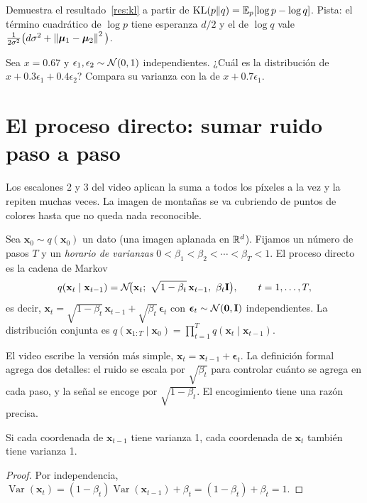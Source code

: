 \documentclass[11pt,letterpaper,oneside]{report}
\newcommand{\xb}{\mathbf{x}}
\newcommand{\eb}{\boldsymbol{\epsilon}}
\newcommand{\Ib}{\mathbf{I}}
\begin{document}
\begin{ejercicio}
Demuestra el resultado~\ref{res:kl} a partir de $\operatorname{KL}(p\Vert q)=\mathbb{E}_p[\log p-\log q]$. Pista: el término cuadrático de $\log p$ tiene esperanza $d/2$ y el de $\log q$ vale $\tfrac{1}{2\sigma^2}\big(d\sigma^2+\left\lVert \boldsymbol\mu_1-\boldsymbol\mu_2 \right\rVert^2\big)$.
\end{ejercicio}

\begin{ejercicio}
Sea $x=0.67$ y $\epsilon_1,\epsilon_2\sim\mathcal{N}(0,1)$ independientes. ¿Cuál es la distribución de $x+0.3\epsilon_1+0.4\epsilon_2$? Compara su varianza con la de $x+0.7\epsilon_1$.
\end{ejercicio}

\section{El proceso directo: sumar ruido paso a paso}\label{sec:directo}

Los escalones 2 y 3 del video aplican la suma a todos los píxeles a la vez y la repiten muchas veces. La imagen de montañas se va cubriendo de puntos de colores hasta que no queda nada reconocible.

\begin{definicion}
Sea $\xb_0\sim q(\xb_0)$ un dato (una imagen aplanada en $\mathbb{R}^d$). Fijamos un número de pasos $T$ y un \emph{horario de varianzas} $0<\beta_1<\beta_2<\cdots<\beta_T<1$. El proceso directo es la cadena de Markov
\[
q(\xb_t\mid\xb_{t-1})=\Normal\!\big(\xb_t;\ \sqrt{1-\beta_t}\,\xb_{t-1},\ \beta_t\Ib\big),\qquad t=1,\dots,T,
\]
es decir, $\xb_t=\sqrt{1-\beta_t}\,\xb_{t-1}+\sqrt{\beta_t}\,\eb_t$ con $\eb_t\sim\Normal(\mathbf 0,\Ib)$ independientes. La distribución conjunta es $q(\xb_{1:T}\mid\xb_0)=\prod_{t=1}^T q(\xb_t\mid\xb_{t-1})$.
\end{definicion}

El video escribe la versión más simple, $\xb_t=\xb_{t-1}+\eb_t$. La definición formal agrega dos detalles: el ruido se escala por $\sqrt{\beta_t}$ para controlar cuánto se agrega en cada paso, y la señal se encoge por $\sqrt{1-\beta_t}$. El encogimiento tiene una razón precisa.

\begin{teorema}
Si cada coordenada de $\xb_{t-1}$ tiene varianza 1, cada coordenada de $\xb_t$ también tiene varianza 1.
\end{teorema}
\begin{proof}
Por independencia, $\operatorname{Var}(\xb_t)=(1-\beta_t)\operatorname{Var}(\xb_{t-1})+\beta_t=(1-\beta_t)+\beta_t=1$.
\end{proof}
\end{document}
